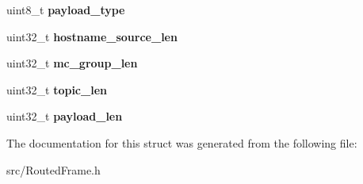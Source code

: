 \begin{DoxyCompactItemize}
\item 
\hypertarget{structrf__header_a4abae9073db60a7ab4b80e7778658ba1}{uint8\-\_\-t {\bfseries payload\-\_\-type}}\label{structrf__header_a4abae9073db60a7ab4b80e7778658ba1}

\item 
\hypertarget{structrf__header_a8956b3eddbdda31b6c2bf59d371f1760}{uint32\-\_\-t {\bfseries hostname\-\_\-source\-\_\-len}}\label{structrf__header_a8956b3eddbdda31b6c2bf59d371f1760}

\item 
\hypertarget{structrf__header_a65b9384e0243f7f003ba70dd271ba939}{uint32\-\_\-t {\bfseries mc\-\_\-group\-\_\-len}}\label{structrf__header_a65b9384e0243f7f003ba70dd271ba939}

\item 
\hypertarget{structrf__header_ab3a3bdae2910df20b49ec7bcd2150b6d}{uint32\-\_\-t {\bfseries topic\-\_\-len}}\label{structrf__header_ab3a3bdae2910df20b49ec7bcd2150b6d}

\item 
\hypertarget{structrf__header_a0ba5e67a02ae9ca32be96cebc272d40f}{uint32\-\_\-t {\bfseries payload\-\_\-len}}\label{structrf__header_a0ba5e67a02ae9ca32be96cebc272d40f}

\end{DoxyCompactItemize}


The documentation for this struct was generated from the following file\-:\begin{DoxyCompactItemize}
\item 
src/Routed\-Frame.\-h\end{DoxyCompactItemize}
